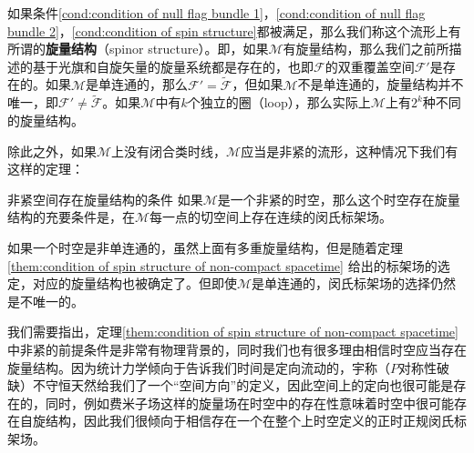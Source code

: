 如果条件\ref{cond:condition of null flag bundle 1}，\ref{cond:condition of null flag bundle 2}，\ref{cond:condition of spin structure}都被满足，那么我们称这个流形上有所谓的\textbf{旋量结构}（spinor structure）。即，如果$\mathcal{M}$有旋量结构，那么我们之前所描述的基于光旗和自旋矢量的旋量系统都是存在的，也即$\mathcal{F}$的双重覆盖空间$\mathcal{F} '$是存在的。如果$\mathcal{M}$是单连通的，那么$\mathcal{F} '=\tilde{\mathcal{F}}$，但如果$\mathcal{M}$不是单连通的，旋量结构并不唯一，即$\mathcal{F} '\neq \tilde{\mathcal{F}}$。如果$\mathcal{M}$中有$k$个独立的圈（loop），那么实际上$\mathcal{M}$上有$2^{k}$种不同的旋量结构。

除此之外，如果$\mathcal{M}$上没有闭合类时线，$\mathcal{M}$应当是非紧的流形，这种情况下我们有这样的定理：

\begin{them}[label={them:condition of spin structure of non-compact spacetime}]{非紧空间存在旋量结构的条件}
	如果$\mathcal{M}$是一个非紧的时空，那么这个时空存在旋量结构的充要条件是，在$\mathcal{M}$每一点的切空间上存在连续的闵氏标架场。
\end{them}

如果一个时空是非单连通的，虽然上面有多重旋量结构，但是随着定理 \ref{them:condition of spin structure of non-compact spacetime} 给出的标架场的选定，对应的旋量结构也被确定了。但即使$\mathcal{M}$是单连通的，闵氏标架场的选择仍然是不唯一的。



我们需要指出，定理\ref{them:condition of spin structure of non-compact spacetime}中非紧的前提条件是非常有物理背景的，同时我们也有很多理由相信时空应当存在旋量结构。因为统计力学倾向于告诉我们时间是定向流动的，宇称（$P$对称性破缺）不守恒天然给我们了一个“空间方向”的定义，因此空间上的定向也很可能是存在的，同时，例如费米子场这样的旋量场在时空中的存在性意味着时空中很可能存在自旋结构，因此我们很倾向于相信存在一个在整个上时空定义的正时正规闵氏标架场。